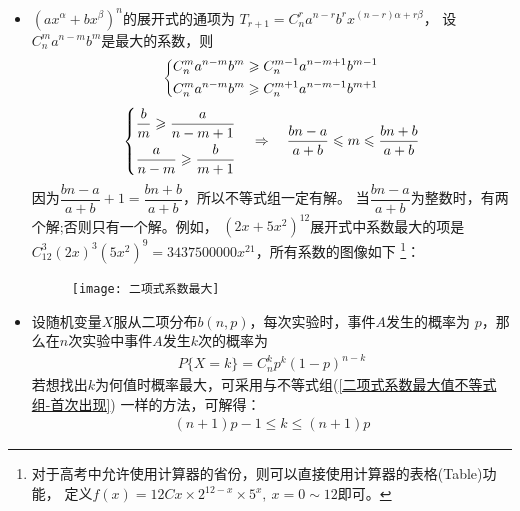 \begin{itemize}[leftmargin=\inteval{\myitemleftmargin}pt,itemsep=
   \inteval{\myitemitempsep}pt,topsep=\inteval{\myitemtopsep}pt]
上面介绍的上台阶、汉诺塔和错排三个问题，如果试图直接寻找答案，无疑是相当困难的，而寻找递推关系则要简单得多。
\item $ \left(ax^{\alpha}+bx^{\beta} \right)^n $的展开式的通项为
$ T_{r+1}=C_n^ra^{n-r}b^rx^{(n-r)\alpha+r\beta} $，
设$ C_n^m a^{n-m}b^m $是最大的系数，则
\begin{align}\label{二项式系数最大值不等式组-首次出现}
    \begin{dcases}
        C_n^m a^{n-m}b^m\geq C_n^{m-1} a^{n-m+1}b^{m-1} \\
        C_n^m a^{n-m}b^m\geq C_n^{m+1} a^{n-m-1}b^{m+1}
    \end{dcases}
\end{align} 
\begin{align*}
    \begin{dcases}
        \dfrac{b}{m}   \geq \dfrac{a}{n-m+1} \\
        \dfrac{a}{n-m} \geq \dfrac{b}{m+1}
    \end{dcases} \quad \Rightarrow \quad 
    \dfrac{bn-a}{a+b} \leq m \leq \dfrac{bn+b}{a+b}
\end{align*} 
因为$ \dfrac{bn-a}{a+b}+1=\dfrac{bn+b}{a+b} $，所以不等式组一定有解。
当$ \dfrac{bn-a}{a+b} $为整数时，有两个解;否则只有一个解。例如，
$ (2x+5x^2)^{12} $展开式中系数最大的项是
$ C_{12}^{3}(2x)^3(5x^2)^9=3437500000x^{21} $，所有系数的图像如下
\footnote{对于高考中允许使用计算器的省份，则可以直接使用计算器的表格(Table)功能，
    定义$ f(x)= 12Cx\times 2^{12-x}\times 5^x,\ x=0\sim 12 $即可。}：
\begin{figure}[h]
    \centering
    \texttt{[image: 二项式系数最大]}
\end{figure} 

\item 设随机变量$ X $服从二项分布$ b(n,p) $，每次实验时，事件$ A $发生的概率为
$ p $，那么在$ n $次实验中事件$ A $发生$ k $次的概率为
\begin{align*}
    P\{X=k\}=C_n^kp^k(1-p)^{n-k}
\end{align*}
若想找出$ k $为何值时概率最大，可采用与不等式组(\ref{二项式系数最大值不等式组-首次出现})
一样的方法，可解得：
\begin{align*}
    (n+1)p-1\leq k \leq (n+1)p 
\end{align*}



\end{itemize}
